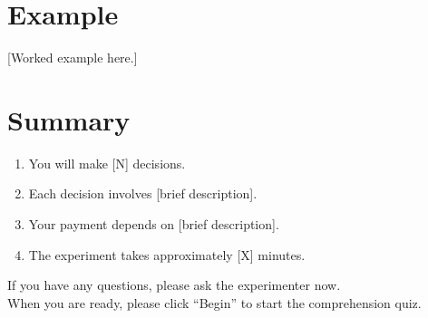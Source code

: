 \documentclass[12pt]{article}
\begin{document}
\section*{Example}


[Worked example here.]

\section*{Summary}

\begin{enumerate}[nosep]
    \item You will make [N] decisions.
    \item Each decision involves [brief description].
    \item Your payment depends on [brief description].
    \item The experiment takes approximately [X] minutes.
\end{enumerate}

\bigskip
\begin{center}
{\small If you have any questions, please ask the experimenter now.} \\[0.5em]
{\small When you are ready, please click ``Begin'' to start the comprehension quiz.}
\end{center}
\end{document}
